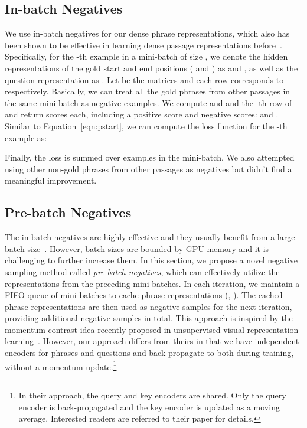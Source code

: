 \documentclass[11pt,a4paper]{article}
\newcommand\ti[1]{\textit{#1}}
\begin{document}
\subsection{In-batch Negatives}
We use in-batch negatives for our dense phrase representations, which also has been shown to be effective in learning dense passage representations before~\cite{karpukhin2020dense}. Specifically, for the -th example in a mini-batch of size , we denote the hidden representations of the gold start and end positions ( and ) as  and , as well as the question representation as . Let  be the  matrices and each row corresponds to  respectively. Basically, we can treat all the gold phrases from other passages  in the same mini-batch as negative examples.  We compute  and  and the -th row of  and  return  scores each, including a positive score and  negative scores:  and . Similar to Equation~\eqref{eqn:pstart}, we can compute the loss function for the -th example as:

Finally, the loss is summed over  examples in the mini-batch.
We also attempted using other non-gold phrases from other passages as negatives but didn't find a meaningful improvement.









\subsection{Pre-batch Negatives}


The in-batch negatives are highly effective and they usually benefit from a large batch size~\citep{karpukhin2020dense}.
However, batch sizes are bounded by GPU memory and it is challenging to further increase them.
In this section, we propose a novel negative sampling method called \ti{pre-batch negatives}, which can effectively utilize the representations from the preceding  mini-batches.
In each iteration, we maintain a FIFO queue of  mini-batches to cache phrase representations (, ).  The cached phrase representations are then used as negative samples for the next iteration, providing  additional negative samples in total. This approach is inspired by the momentum contrast idea recently proposed in unsupervised visual representation learning~\cite{he2020momentum}. However, our approach differs from theirs in that we have independent encoders for phrases and questions and back-propagate to both during training, without a momentum update.\footnote{In their approach, the query and key encoders are shared. Only the query encoder is back-propagated and the key encoder is updated as a moving average. Interested readers are referred to their paper for details.}
\end{document}
